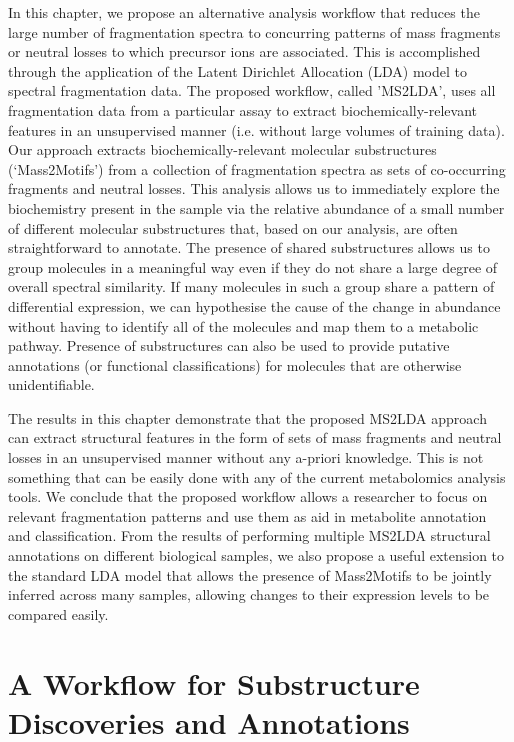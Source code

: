 In this chapter, we propose an alternative analysis workflow that reduces the large number of fragmentation spectra to concurring patterns of mass fragments or neutral losses to which precursor ions are associated. This is accomplished through the application of the Latent Dirichlet Allocation (LDA) model to spectral fragmentation data. The proposed workflow, called 'MS2LDA', uses all fragmentation data from a particular assay to extract biochemically-relevant features in an unsupervised manner (i.e. without large volumes of training data). Our approach extracts biochemically-relevant molecular substructures (‘Mass2Motifs’) from a collection of fragmentation spectra as sets of co-occurring fragments and neutral losses. This analysis allows us to immediately explore the biochemistry present in the sample via the relative abundance of a small number of different molecular substructures that, based on our analysis, are often straightforward to annotate. The presence of shared substructures allows us to group molecules in a meaningful way even if they do not share a large degree of overall spectral similarity. If many molecules in such a group share a pattern of differential expression, we can hypothesise the cause of the change in abundance without having to identify all of the molecules and map them to a metabolic pathway. Presence of substructures can also be used to provide putative annotations (or functional classifications) for molecules that are otherwise unidentifiable. 

The results in this chapter demonstrate that the proposed MS2LDA approach can extract structural features in the form of sets of mass fragments and neutral losses in an unsupervised manner without any a-priori knowledge. This is not something that can be easily done with any of the current metabolomics analysis tools. We conclude that the proposed workflow allows a researcher to focus on relevant fragmentation patterns and use them as aid in metabolite annotation and classification. From the results of performing multiple MS2LDA structural annotations on different biological samples, we also propose a useful extension to the standard LDA model that allows the presence of Mass2Motifs to be jointly inferred across many samples, allowing changes to their expression levels to be compared easily.

\section{A Workflow for Substructure Discoveries and Annotations}

